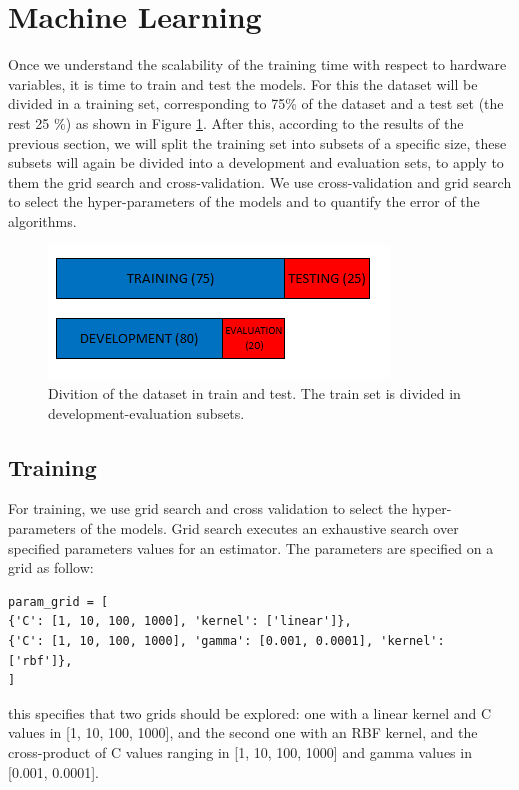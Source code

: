 \section{Machine Learning}
Once we understand the scalability of the training time with respect to hardware variables, it is time to train and test the models. For this the dataset will be divided in a training set, corresponding to 75\% of the dataset and a test set (the rest 25 \%) as shown in Figure \ref{fig:metho3}. After this, according to the results of the previous section, we will split the training set into subsets of a specific size, these subsets will again be divided into a development and evaluation sets, to apply to them the grid search and cross-validation. We use cross-validation and grid search to select the hyper-parameters of the models and to quantify the error of the algorithms. 
\begin{figure}[h!]
	\centering
	\includegraphics[width=0.6\linewidth]{TeX_files/Imagenes/metho_3}
	\caption{Divition of the dataset in train and test. The train set is divided in development-evaluation subsets.}
	\label{fig:metho3}
\end{figure}
\subsection{Training}
For training, we use grid search and cross validation to select the hyper-parameters of the models. Grid search executes an exhaustive search over specified parameters values for an estimator. The parameters are specified on a grid as follow:
\begin{verbatim}
param_grid = [
{'C': [1, 10, 100, 1000], 'kernel': ['linear']},
{'C': [1, 10, 100, 1000], 'gamma': [0.001, 0.0001], 'kernel': ['rbf']},
]
\end{verbatim}
this specifies that two grids should be explored: one with a linear kernel and C values in [1, 10, 100, 1000], and the second one with an RBF kernel, and the cross-product of C values ranging in [1, 10, 100, 1000] and gamma values in [0.001, 0.0001].

